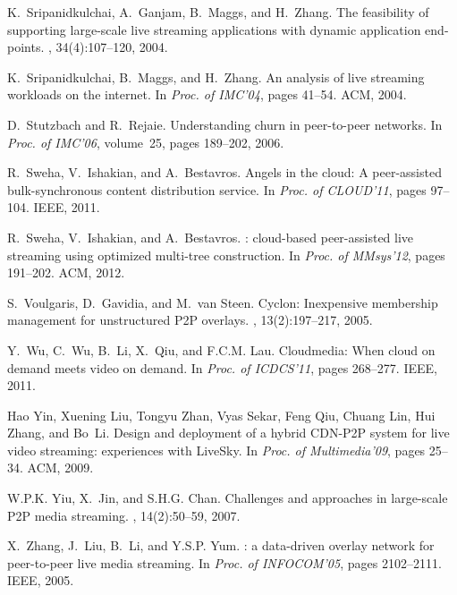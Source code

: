 {\begin{thebibliography}{5}
K.~Sripanidkulchai, A.~Ganjam, B.~Maggs, and H.~Zhang.
\newblock The feasibility of supporting large-scale live streaming applications
  with dynamic application end-points.
, 34(4):107--120,
  2004.

K.~Sripanidkulchai, B.~Maggs, and H.~Zhang.
\newblock An analysis of live streaming workloads on the internet.
\newblock In {\em Proc. of IMC'04}, pages 41--54. ACM, 2004.

D.~Stutzbach and R.~Rejaie.
\newblock Understanding churn in peer-to-peer networks.
\newblock In {\em Proc. of IMC'06}, volume~25, pages 189--202, 2006.

R.~Sweha, V.~Ishakian, and A.~Bestavros.
\newblock Angels in the cloud: A peer-assisted bulk-synchronous content
  distribution service.
\newblock In {\em Proc. of CLOUD'11}, pages 97--104. IEEE, 2011.

R.~Sweha, V.~Ishakian, and A.~Bestavros.
: cloud-based peer-assisted live streaming using optimized
  multi-tree construction.
\newblock In {\em Proc. of MMsys'12}, pages 191--202. ACM, 2012.

S.~Voulgaris, D.~Gavidia, and M.~van Steen.
\newblock Cyclon: Inexpensive membership management for unstructured {P2P}
  overlays.
, 13(2):197--217,
  2005.

Y.~Wu, C.~Wu, B.~Li, X.~Qiu, and F.C.M. Lau.
\newblock Cloudmedia: When cloud on demand meets video on demand.
\newblock In {\em Proc. of ICDCS'11}, pages 268--277. IEEE, 2011.

Hao Yin, Xuening Liu, Tongyu Zhan, Vyas Sekar, Feng Qiu, Chuang Lin, Hui Zhang,
  and Bo~Li.
\newblock Design and deployment of a hybrid {CDN-P2P} system for live video
  streaming: experiences with {LiveSky}.
\newblock In {\em Proc. of Multimedia'09}, pages 25--34. ACM, 2009.

W.P.K. Yiu, X.~Jin, and S.H.G. Chan.
\newblock Challenges and approaches in large-scale {P2P} media streaming.
, 14(2):50--59, 2007.

X.~Zhang, J.~Liu, B.~Li, and Y.S.P. Yum.
: a data-driven overlay network for peer-to-peer
  live media streaming.
\newblock In {\em Proc. of INFOCOM'05}, pages 2102--2111. IEEE, 2005.


\end{thebibliography}}
